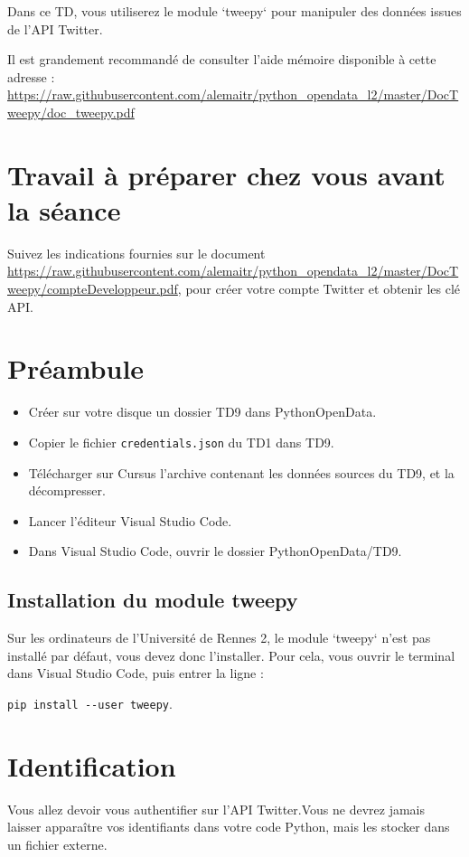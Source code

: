 \documentclass[11pt,a4paper]{article}
\begin{document}
Dans ce TD, vous utiliserez le module `tweepy` pour manipuler des données issues de l'API Twitter.

Il est grandement recommandé de consulter l'aide mémoire disponible à cette adresse : 
\url{https://raw.githubusercontent.com/alemaitr/python_opendata_l2/master/DocTweepy/doc_tweepy.pdf}

\section*{Travail à préparer chez vous avant la séance}

Suivez les indications fournies sur le document \url{https://raw.githubusercontent.com/alemaitr/python_opendata_l2/master/DocTweepy/compteDeveloppeur.pdf}, pour créer votre compte Twitter et obtenir les clé API. 

\section*{Préambule}
\begin{itemize}
    \item Créer sur votre disque un dossier TD9 dans PythonOpenData. 
    \item Copier le fichier \verb+credentials.json+ du TD1 dans TD9.
    \item Télécharger sur Cursus l'archive contenant les données sources du TD9, et la décompresser.
    \item Lancer l'éditeur Visual Studio Code.
    \item Dans Visual Studio Code, ouvrir le dossier PythonOpenData/TD9. 
\end{itemize}

\subsection*{Installation du module tweepy}

Sur les ordinateurs de l'Université de Rennes 2, le module `tweepy` n'est pas installé par défaut, vous devez donc l'installer. Pour cela, vous ouvrir le terminal dans Visual Studio Code, puis entrer la ligne : 

\verb+pip install --user tweepy+.

\section{Identification}

Vous allez devoir vous authentifier sur l'API Twitter.Vous ne devrez jamais laisser apparaître vos identifiants dans votre code Python, mais les stocker dans un fichier externe.
\end{document}
